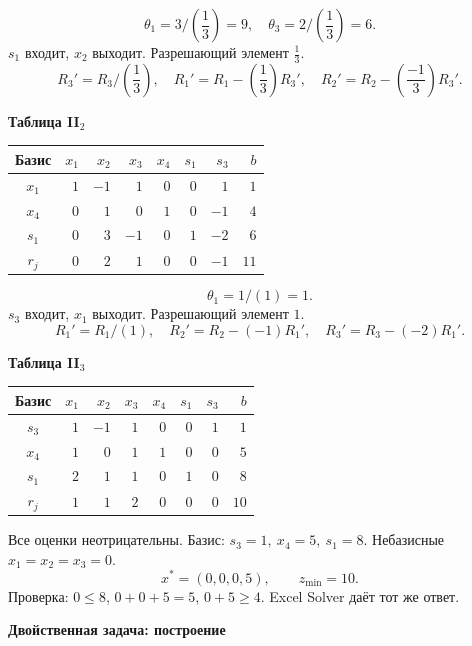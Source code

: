 \documentclass[12pt,a4paper]{article}
\begin{document}
\[\theta_{1}=3/(\frac{1}{3})=9,\quad \theta_{3}=2/(\frac{1}{3})=6.\]
$s_{1}$ входит, $x_{2}$ выходит. Разрешающий элемент $\frac{1}{3}$.
{\small\[R_{3}'=R_{3}/(\frac{1}{3}),\quad R_{1}'=R_{1}-(\frac{1}{3})R_{3}',\quad R_{2}'=R_{2}-(\frac{-1}{3})R_{3}'.\]}
\newpage
\par\textbf{Таблица II$_{2}$}\begin{center}\small\setlength{\tabcolsep}{4pt}\begin{tabular}{c|rrrrrr|r}\hline
Базис & $x_{1}$ & $x_{2}$ & $x_{3}$ & $x_{4}$ & $s_{1}$ & \cellcolor{cyan!18}$s_{3}$ & $b$\\\hline
\rowcolor{yellow!25}$x_{1}$ & $1$ & $-1$ & $1$ & $0$ & $0$ & \cellcolor{orange!45}$1$ & $1$\\
$x_{4}$ & $0$ & $1$ & $0$ & $1$ & $0$ & \cellcolor{cyan!18}$-1$ & $4$\\
$s_{1}$ & $0$ & $3$ & $-1$ & $0$ & $1$ & \cellcolor{cyan!18}$-2$ & $6$\\
\hline $r_j$ & $0$ & $2$ & $1$ & $0$ & $0$ & \cellcolor{cyan!18}$-1$ & $11$\\\hline\end{tabular}\end{center}
\[\theta_{1}=1/(1)=1.\]
$s_{3}$ входит, $x_{1}$ выходит. Разрешающий элемент $1$.
{\small\[R_{1}'=R_{1}/(1),\quad R_{2}'=R_{2}-(-1)R_{1}',\quad R_{3}'=R_{3}-(-2)R_{1}'.\]}
\par\textbf{Таблица II$_{3}$}\begin{center}\small\setlength{\tabcolsep}{4pt}\begin{tabular}{c|rrrrrr|r}\hline
Базис & $x_{1}$ & $x_{2}$ & $x_{3}$ & $x_{4}$ & $s_{1}$ & $s_{3}$ & $b$\\\hline
$s_{3}$ & $1$ & $-1$ & $1$ & $0$ & $0$ & $1$ & $1$\\
$x_{4}$ & $1$ & $0$ & $1$ & $1$ & $0$ & $0$ & $5$\\
$s_{1}$ & $2$ & $1$ & $1$ & $0$ & $1$ & $0$ & $8$\\
\hline $r_j$ & $1$ & $1$ & $2$ & $0$ & $0$ & $0$ & $10$\\\hline\end{tabular}\end{center}

Все оценки неотрицательны. Базис: $s_3=1,\ x_4=5,\ s_1=8$.
Небазисные $x_1=x_2=x_3=0$.
\[
\boxed{x^*=(0,0,0,5),\qquad z_{\min}=10.}
\]
Проверка: $0\le8$, $0+0+5=5$, $0+5\ge4$.
Excel Solver даёт тот же ответ.


\newpage
\par\textbf{Двойственная задача: построение}\par
\end{document}
